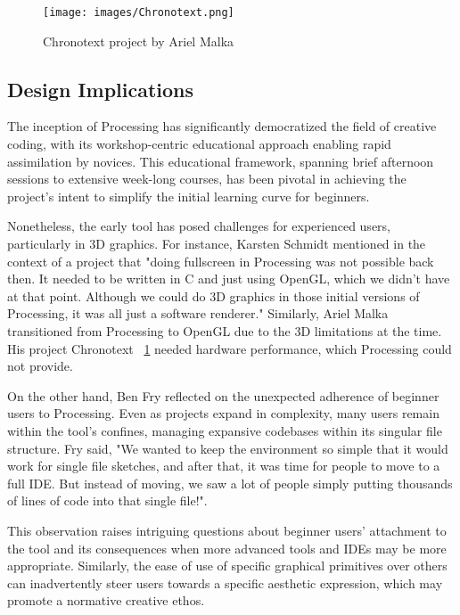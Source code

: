 \clearpage

\begin{figure}[h]
  \texttt{[image: images/Chronotext.png]}
  \caption{Chronotext project by Ariel Malka}
  \label{fig:chronotext}
\end{figure}

\subsection{Design Implications}



The inception of Processing has significantly democratized the field of creative coding, with its workshop-centric educational approach enabling rapid assimilation by novices. This educational framework, spanning brief afternoon sessions to extensive week-long courses, has been pivotal in achieving the project's intent to simplify the initial learning curve for beginners. 

Nonetheless, the early tool has posed challenges for experienced users, particularly in 3D graphics. For instance, Karsten Schmidt mentioned in the context of a project that "doing fullscreen in Processing was not possible back then. It needed to be written in C and just using OpenGL, which we didn't have at that point. Although we could do 3D graphics in those initial versions of Processing, it was all just a software renderer." Similarly, Ariel Malka transitioned from Processing to OpenGL due to the 3D limitations at the time. His project Chronotext ~\ref{fig:chronotext} needed hardware performance, which Processing could not provide.

On the other hand, Ben Fry reflected on the unexpected adherence of beginner users to Processing. Even as projects expand in complexity, many users remain within the tool's confines, managing expansive codebases within its singular file structure. Fry said, "We wanted to keep the environment so simple that it would work for single file sketches, and after that, it was time for people to move to a full IDE. But instead of moving, we saw a lot of people simply putting thousands of lines of code into that single file!". 

This observation raises intriguing questions about beginner users' attachment to the tool and its consequences when more advanced tools and IDEs may be more appropriate. Similarly, the ease of use of specific graphical primitives over others can inadvertently steer users towards a specific aesthetic expression, which may promote a normative creative ethos.

